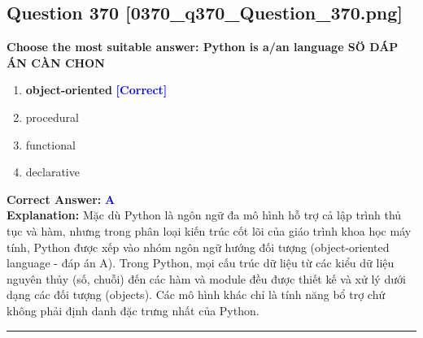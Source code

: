 \documentclass[11pt,a4paper]{article}
\begin{document}
\begin{minipage}{\textwidth}
\subsection*{Question 370 \quad \footnotesize{[0370\_q370\_Question\_370.png]}}
\noindent \textbf{Choose the most suitable answer: Python is a/an language SÖ DÁP ÁN CÀN CHON}

\begin{enumerate}[label=\Alph*.]
    \item \textbf{object-oriented} \hfill \textcolor{blue}{\textbf{[Correct]}}
    \item procedural
    \item functional
    \item declarative
\end{enumerate}

\noindent \textbf{Correct Answer:} \textcolor{blue}{\textbf{A}} \\[2pt]
\noindent \textbf{Explanation:} Mặc dù Python là ngôn ngữ đa mô hình hỗ trợ cả lập trình thủ tục và hàm, nhưng trong phân loại kiến trúc cốt lõi của giáo trình khoa học máy tính, Python được xếp vào nhóm ngôn ngữ hướng đối tượng (object-oriented language - đáp án A). Trong Python, mọi cấu trúc dữ liệu từ các kiểu dữ liệu nguyên thủy (số, chuỗi) đến các hàm và module đều được thiết kế và xử lý dưới dạng các đối tượng (objects). Các mô hình khác chỉ là tính năng bổ trợ chứ không phải định danh đặc trưng nhất của Python.

\par\vspace{0.3cm}
\hrule
\vspace{0.3cm}
\end{minipage}
\end{document}
